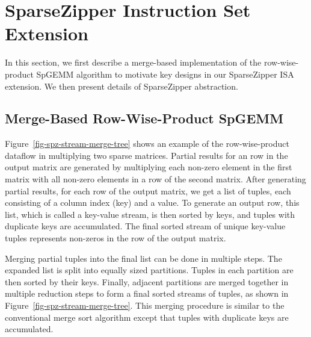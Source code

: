 
\section{S\lowercase{parse}Z\lowercase{ipper} Instruction Set Extension}
\label{sec-spz-isa}

In this section, we first describe a merge-based implementation of the
row-wise-product SpGEMM algorithm to motivate key designs in our SparseZipper
ISA extension.
We then present details of SparseZipper abstraction.




\subsection{Merge-Based Row-Wise-Product SpGEMM}
\label{sec-spz-isa-merge-spgemm}

Figure~\ref{fig-spz-stream-merge-tree} shows an example of the row-wise-product
dataflow in multiplying two sparse matrices.
Partial results for an  row in the output matrix are generated by
multiplying each non-zero element  in the first matrix with all
non-zero elements  in a  row of the second matrix.
After generating partial results, for each row of the output matrix, we get
a list of tuples, each consisting of a column index (key) and a value.
To generate an output row, this list, which is called a key-value stream, is
then sorted by keys, and tuples with duplicate keys are accumulated.
The final sorted stream of unique key-value tuples represents non-zeros in the
 row of the output matrix.

Merging partial tuples into the final list can be done in multiple steps.
The expanded list is split into equally sized partitions.
Tuples in each partition are then sorted by their keys.
Finally, adjacent partitions are merged together in multiple reduction steps to
form a final sorted streams of tuples, as shown in
Figure~\ref{fig-spz-stream-merge-tree}.
This merging procedure is similar to the conventional merge sort algorithm
except that tuples with duplicate keys are accumulated.

